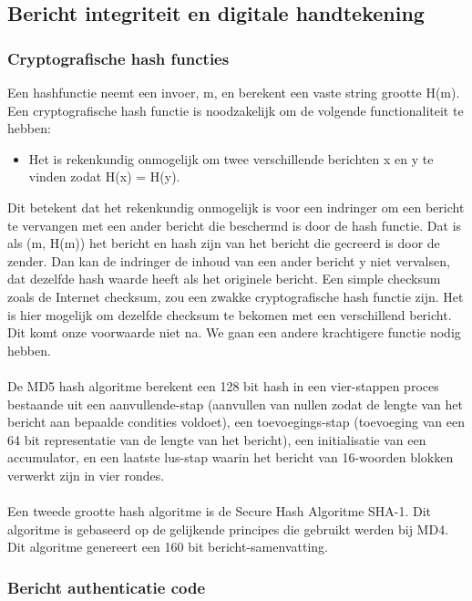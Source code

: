 \subsection{Bericht integriteit en digitale handtekening}
\subsubsection{Cryptografische hash functies}

Een hashfunctie neemt een invoer, m, en berekent een vaste string grootte H(m). Een cryptografische hash functie is noodzakelijk om de volgende functionaliteit te hebben:
\begin{itemize}
\item Het is rekenkundig onmogelijk om twee verschillende berichten x en y te vinden zodat H(x) = H(y).
\end{itemize}
Dit betekent dat het rekenkundig onmogelijk is voor een indringer om een bericht te vervangen met een ander bericht die beschermd is door de hash functie. Dat is als (m, H(m)) het bericht en hash zijn van het bericht die gecreerd is door de zender. Dan kan de indringer de inhoud van een ander bericht y niet vervalsen, dat dezelfde hash waarde heeft als het originele bericht.
Een simple checksum zoals de Internet checksum, zou een zwakke cryptografische hash functie zijn. Het is hier mogelijk om dezelfde checksum te bekomen met een verschillend bericht. Dit komt onze voorwaarde niet na. We gaan een andere krachtigere functie nodig hebben.
\\\\
De MD5 hash algoritme berekent een 128 bit hash in een vier-stappen proces bestaande uit een aanvullende-stap (aanvullen van nullen zodat de lengte van het bericht aan bepaalde condities voldoet), een toevoegings-stap (toevoeging van een 64 bit representatie van de lengte van het bericht), een initialisatie van een accumulator, en een laatste lus-stap waarin het bericht van 16-woorden blokken verwerkt zijn in vier rondes.
\\\\
Een tweede grootte hash algoritme is de Secure Hash Algoritme SHA-1. Dit algoritme is gebaseerd op de gelijkende principes die gebruikt werden bij MD4. Dit algoritme genereert een 160 bit bericht-samenvatting.

\clearpage

\subsubsection{Bericht authenticatie code}

